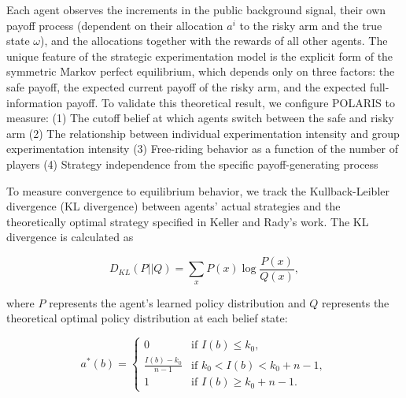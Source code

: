 \documentclass[a4paper,12pt]{report}
\begin{document}
Each agent observes the increments in the public background signal, their own payoff process (dependent on their allocation $a^i$ to the risky arm and the true state $\omega$), and the allocations together with the rewards of all other agents. The unique feature of the strategic experimentation model is the explicit form of the symmetric Markov perfect equilibrium, which depends only on three factors: the safe payoff, the expected current payoff of the risky arm, and the expected full-information payoff. To validate this theoretical result, we configure POLARIS to measure: (1) The cutoff belief at which agents switch between the safe and risky arm
(2) The relationship between individual experimentation intensity and group experimentation intensity
(3) Free-riding behavior as a function of the number of players
(4) Strategy independence from the specific payoff-generating process

To measure convergence to equilibrium behavior, we track the Kullback-Leibler divergence (KL divergence) between agents' actual strategies and the theoretically optimal strategy specified in Keller and Rady's work. The KL divergence is calculated as

\begin{equation}
    D_{KL}(P||Q) = \sum_{x} P(x) \log\frac{P(x)}{Q(x)},
\end{equation}

where $P$ represents the agent's learned policy distribution and $Q$ represents the theoretical optimal policy distribution at each belief state:

\begin{equation}
    a^*(b) =
    \begin{cases}
        0                    & \text{if } I(b) \leq k_0,            \\
        \frac{I(b)-k_0}{n-1} & \text{if } k_0 < I(b) < k_0 + n - 1, \\
        1                    & \text{if } I(b) \geq k_0 + n - 1.
    \end{cases}
\end{equation}
\end{document}
